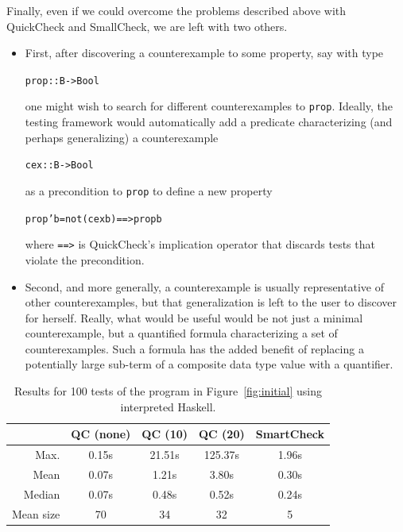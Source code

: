 \documentclass[10pt]{sigplanconf}
\newenvironment{code}{\begin{alltt}}{\end{alltt}}
\newcommand{\ttp}[1]{\texttt{#1}}
\begin{document}
Finally, even if we could overcome the problems described above with QuickCheck
and SmallCheck, we are left with two others.
\begin{itemize}
  \item First, after discovering a counterexample to some property, say with
    type
%
\begin{code}
prop :: B -> Bool
\end{code}
%
\noindent
one might wish to search for different counterexamples to \ttp{prop}.  Ideally,
the testing framework would automatically add a predicate characterizing (and
perhaps generalizing) a counterexample
%
\begin{code}
cex :: B -> Bool
\end{code}
%
\noindent
as a precondition to \ttp{prop} to define a new property
\begin{code}
prop' b = not (cex b) ==> prop b
\end{code}
%
\noindent
where \ttp{==>} is QuickCheck's implication operator that discards tests that
violate the precondition.

  \item Second, and more generally, a counterexample is usually representative
    of other counterexamples, but that generalization is left to the user to
    discover for herself.  Really, what would be useful would be not just a
    minimal counterexample, but a quantified formula characterizing a set of
    counterexamples.  Such a formula has the added benefit of replacing a
    potentially large sub-term of a composite data type value with a quantifier.
\end{itemize}

\begin{table}[ht]
\footnotesize
  \begin{center}
    \begin{tabular}{|r||c|c|c|c|}
\hline
 & QC (none) & QC (10) & QC (20) & SmartCheck \\
\hline \hline
Max.  & 0.15s & 21.51s & 125.37s & 1.96s\\
\hline
Mean  & 0.07s & 1.21s & 3.80s & 0.30s\\
\hline
Median & 0.07s & 0.48s & 0.52s & 0.24s\\
\hline
Mean size & 70 & 34 & 32 & 5\\
\hline
    \end{tabular}
  \end{center}
  \caption{Results for 100 tests of the program in Figure~\ref{fig:initial}
    using interpreted Haskell.}
  \label{table:results}
\end{table}
\end{document}
